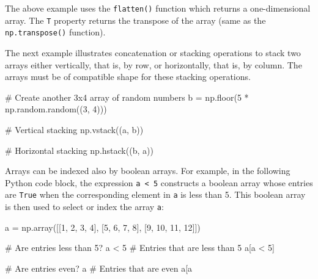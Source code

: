 The above example uses the \texttt{flatten()} function which returns a one-dimensional array. The \texttt{T} property returns the transpose of the array (same as the \texttt{np.transpose()} function). %

The next example illustrates concatenation or stacking operations to stack two arrays either vertically, that is, by row, or horizontally, that is, by column. The arrays must be of compatible shape for these stacking operations. 

\begin{samepage}
\begin{pythoncode}
# Create another 3x4 array of random numbers
b = np.floor(5 * np.random.random((3, 4)))

# Vertical stacking
np.vstack((a, b))

# Horizontal stacking
np.hstack((b, a))
\end{pythoncode}
\end{samepage}

Arrays can be indexed also by boolean arrays. For example, in the following Python code block, the expression \texttt{a < 5} constructs a boolean array whose entries are \texttt{True} when the corresponding element in \texttt{a} is less than 5. This boolean array is then used to select or index the array \texttt{a}:

\begin{samepage}
\begin{pythoncode}
a = np.array([[1,  2,  3,  4], 
              [5,  6,  7,  8], 
              [9, 10, 11, 12]])

# Are entries less than 5?
a < 5
# Entries that are less than 5
a[a < 5]

# Are entries even?
a%
# Entries that are even
a[a%
\end{pythoncode}
\end{samepage}



